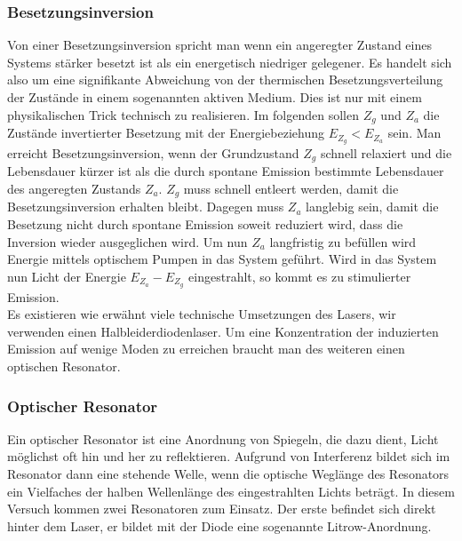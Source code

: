 \documentclass[12pt]{article}
\begin{document}
\subsubsection{Besetzungsinversion}
Von einer Besetzungsinversion spricht man wenn ein angeregter Zustand eines Systems stärker besetzt ist als ein energetisch niedriger gelegener. Es handelt sich also um eine signifikante Abweichung von der thermischen Besetzungsverteilung der Zustände in einem sogenannten aktiven Medium. Dies ist nur mit einem physikalischen Trick technisch zu realisieren.
Im folgenden sollen $Z_g$ und $Z_a$ die Zustände invertierter Besetzung mit der Energiebeziehung $E_{Z_g}<E_{Z_a}$ sein.
Man erreicht Besetzungsinversion, wenn der Grundzustand $Z_g$ schnell relaxiert und die Lebensdauer kürzer ist als die durch spontane Emission bestimmte Lebensdauer des angeregten  Zustands $Z_a$. $Z_g$ muss schnell entleert werden, damit die Besetzungsinversion erhalten bleibt. Dagegen muss $Z_a$ langlebig sein, damit die Besetzung nicht durch spontane Emission soweit reduziert wird, dass die Inversion wieder ausgeglichen wird. Um nun $Z_a$ langfristig zu befüllen wird Energie mittels optischem Pumpen in das System geführt. Wird in das System nun Licht der Energie $E_{Z_a}-E_{Z_g}$ eingestrahlt, so kommt es zu stimulierter Emission.\\
Es existieren wie erwähnt viele technische Umsetzungen des Lasers, wir verwenden einen Halbleiderdiodenlaser.
Um eine Konzentration der induzierten Emission auf wenige Moden zu erreichen braucht man des weiteren einen optischen Resonator.

\subsubsection{Optischer Resonator}
Ein optischer Resonator ist eine Anordnung von Spiegeln, die dazu dient, Licht möglichst oft hin und her zu reflektieren. Aufgrund von Interferenz bildet sich im Resonator dann eine stehende Welle, wenn die optische Weglänge des Resonators ein Vielfaches der halben Wellenlänge des eingestrahlten Lichts beträgt. In diesem Versuch kommen zwei Resonatoren zum Einsatz. Der erste befindet sich direkt hinter dem Laser, er bildet mit der Diode eine sogenannte Litrow-Anordnung.
\end{document}
